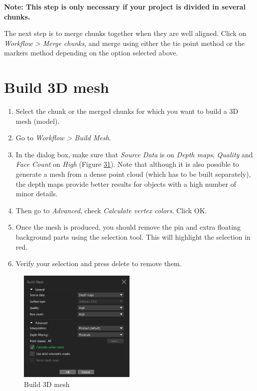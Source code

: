 \documentclass[
]{book}
\theoremstyle{definition}
\theoremstyle{definition}
\theoremstyle{definition}
\theoremstyle{definition}
\theoremstyle{remark}
\begin{document}
\textbf{Note: This step is only necessary if your project is divided in
several chunks.}

The next step is to merge chunks together when they are well aligned.
Click on \emph{Workflow \textgreater{} Merge chunks}, and merge using either the tie
point method or the markers method depending on the option selected
above.

\hypertarget{build-3d-mesh}{%
\section{Build 3D mesh}\label{build-3d-mesh}}

\begin{enumerate}
\def\labelenumi{\arabic{enumi}.}
\item
  Select the chunk or the merged chunks for which you want to build a
  3D mesh (model).
\item
  Go to \emph{Workflow \textgreater{} Build Mesh}.
\item
  In the dialog box, make sure that \emph{Source Data} is on \emph{Depth maps},
  \emph{Quality} and \emph{Face Count} on \emph{High} (Figure
  \protect\hyperlink{fig:3d_mesh}{31}).
  Note that although it is also possible to generate a mesh from a
  dense point cloud (which has to be built separately), the depth maps
  provide better results for objects with a high number of minor
  details.
\item
  Then go to \emph{Advanced}, check \emph{Calculate vertex colors}. Click OK.
\item
  Once the mesh is produced, you should remove the pin and extra
  floating background parts using the selection tool. This will
  highlight the selection in red.
\item
  Verify your selection and press delete to remove them.
\end{enumerate}

\begin{figure}
\hypertarget{fig:3d_mesh}{%
\centering
\includegraphics[width=0.5\textwidth,height=\textheight]{Figures/metashape_build_mesh.png}
\caption{Build 3D mesh}\label{fig:3d_mesh}
}
\end{figure}
\end{document}
